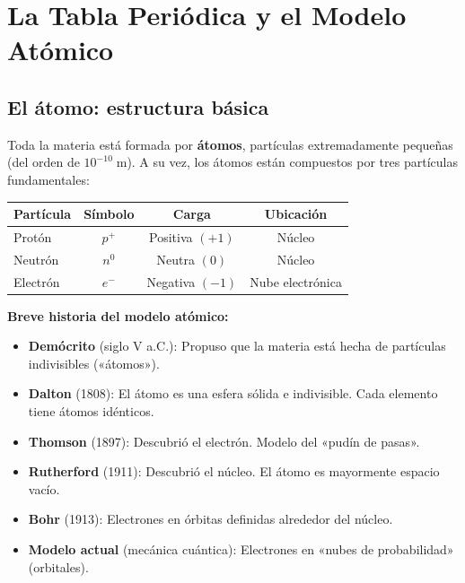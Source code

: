 \documentclass[12pt, letterpaper]{article}
\begin{document}

\section{La Tabla Periódica y el Modelo Atómico}

\subsection{El átomo: estructura básica}

Toda la materia está formada por \textbf{átomos}, partículas extremadamente pequeñas (del orden de $10^{-10}\;\text{m}$). A su vez, los átomos están compuestos por tres partículas fundamentales:

\begin{cuadroteoria}
  \begin{center}
    \begin{tabular}{lccc}
      \toprule
      \textbf{Partícula} & \textbf{Símbolo} & \textbf{Carga}  & \textbf{Ubicación} \\
      \midrule
      Protón             & $p^+$            & Positiva $(+1)$ & Núcleo             \\
      Neutrón            & $n^0$            & Neutra $(0)$    & Núcleo             \\
      Electrón           & $e^-$            & Negativa $(-1)$ & Nube electrónica   \\
      \bottomrule
    \end{tabular}
  \end{center}
\end{cuadroteoria}

\begin{cuadroadvertencia}
  \textbf{Breve historia del modelo atómico:}
  \begin{itemize}[leftmargin=*]
    \item \textbf{Demócrito} (siglo V a.C.): Propuso que la materia está hecha de partículas indivisibles («átomos»).
    \item \textbf{Dalton} (1808): El átomo es una esfera sólida e indivisible. Cada elemento tiene átomos idénticos.
    \item \textbf{Thomson} (1897): Descubrió el electrón. Modelo del «pudín de pasas».
    \item \textbf{Rutherford} (1911): Descubrió el núcleo. El átomo es mayormente espacio vacío.
    \item \textbf{Bohr} (1913): Electrones en órbitas definidas alrededor del núcleo.
    \item \textbf{Modelo actual} (mecánica cuántica): Electrones en «nubes de probabilidad» (orbitales).
  \end{itemize}
\end{cuadroadvertencia}
\end{document}

